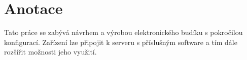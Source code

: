 \section*{Anotace}
Tato práce se zabývá návrhem a výrobou elektronického budíku s pokročilou
konfigurací. Zařízení lze připojit k serveru%
s příslušným software a tím dále rozšířit možnosti jeho využití.
